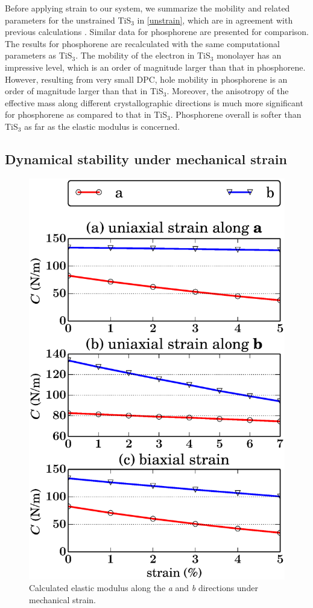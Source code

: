 Before  applying strain to our system, we summarize  the mobility and related parameters for the unstrained TiS$_3$ in \autoref{unstrain}, which are in agreement with previous calculations \cite{Dai2015}. Similar data for phosphorene are presented for comparison. The results for phosphorene are recalculated with the same computational parameters as TiS$_3$. The mobility of the electron in TiS$_3$ monolayer has an impressive level, which is an order of magnitude larger than that in phosphorene. However, resulting from very small DPC, hole mobility in phosphorene is an order of magnitude larger than that in TiS$_3$.  Moreover, the anisotropy of the effective mass along different crystallographic directions is much more significant for phosphorene as compared to that in TiS$_3$. Phosphorene overall is softer than TiS$_3$ as far as the elastic modulus is concerned.

\subsection{Dynamical stability under  mechanical strain}

\begin{figure}[htb]
\centering
\includegraphics[width=0.6\linewidth]{Mob_stiffness.eps}
\caption{Calculated elastic modulus along the \textit{a} and \textit{b} directions under mechanical strain. \label{stiffness}}	
\end{figure}

